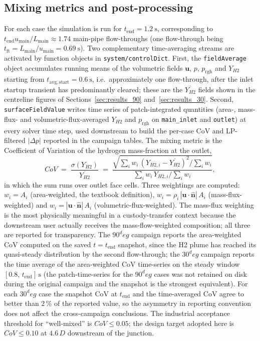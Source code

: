 \documentclass[11pt,a4paper]{article}
\def\Hi{H2}%
\def\CoV{CoV}%
\def\circ{ deg}%
\newcommand{\Hi}{\ensuremath{\mathrm{H_2}}}
\newcommand{\CoV}{\ensuremath{\mathrm{CoV}}}
\begin{document}
\subsection{Mixing metrics and post-processing}
\label{sec:method_metrics}
For each case the simulation is run for
\(t_{\mathrm{end}} = \SI{1.2}{\second}\), corresponding to
\(t_{\mathrm{end}} u_{\mathrm{main}}/L_{\mathrm{main}} \approx 1.74\)
main-pipe flow-throughs (one flow-through being
\(t_{\mathrm{ft}} = L_{\mathrm{main}}/u_{\mathrm{main}}
= \SI{0.69}{\second}\)). Two complementary time-averaging streams
are activated by function objects in \texttt{system/controlDict}.
First, the \texttt{fieldAverage} object accumulates running means
of the volumetric fields \(\mathbf{u}\), \(p\),
\(p_{\mathrm{rgh}}\) and \(Y_{\Hi}\) starting from
\(t_{\mathrm{avg,start}} = \SI{0.6}{\second}\), i.e.\
approximately one flow-through, after the inlet startup transient
has predominantly cleared; these are the \(\overline{Y_{\Hi}}\)
fields shown in the centreline figures of
Sections~\ref{sec:results_90} and~\ref{sec:results_30}. Second,
\texttt{surfaceFieldValue} writes time series of patch-integrated
quantities (area-, mass-flux- and volumetric-flux-averaged
\(Y_{\Hi}\) and \(p_{\mathrm{rgh}}\) on \texttt{main\_inlet} and
\texttt{outlet}) at every solver time step, used downstream to
build the per-case CoV and LP-filtered \(|\Delta p|\) reported in
the campaign tables. The mixing metric is the Coefficient of
Variation of the hydrogen mass-fraction at the outlet,
\begin{equation}
\CoV \;=\; \frac{\sigma\!\left(Y_{\Hi}\right)}{\overline{Y_{\Hi}}}
\;=\; \frac{\sqrt{\sum_i w_i\,(Y_{\Hi,i}-\overline{Y_{\Hi}})^2/\sum_i w_i}}
{\sum_i w_i\,Y_{\Hi,i}/\sum_i w_i},
\label{eq:cov}
\end{equation}
in which the sum runs over outlet face cells. Three weightings are
computed: \(w_i = A_i\) (area-weighted, the textbook definition),
\(w_i = \rho_i\,|\mathbf{u}\cdot\hat{\mathbf{n}}|\,A_i\)
(mass-flux-weighted) and
\(w_i = |\mathbf{u}\cdot\hat{\mathbf{n}}|\,A_i\)
(volumetric-flux-weighted). The mass-flux weighting is the most
physically meaningful in a custody-transfer context because the
downstream user actually receives the mass-flow-weighted
composition; all three are reported for transparency. The
\(90^\circ\) campaign reports the area-weighted CoV computed on
the saved \(t=t_{\mathrm{end}}\) snapshot, since the \Hi{} plume
has reached its quasi-steady distribution by the second
flow-through; the \(30^\circ\) campaign reports the time average
of the area-weighted CoV time-series on the steady
window \([0.8,\,t_{\mathrm{end}}]\,\si{\second}\) (the
patch-time-series for the \(90^\circ\) cases was not retained on
disk during the original campaign and the snapshot is the
strongest equivalent). For each \(30^\circ\) case the snapshot
CoV at \(t_{\mathrm{end}}\) and the time-averaged CoV agree to
better than \(2\,\%\) of the reported value, so the asymmetry in
reporting convention does not affect the cross-campaign
conclusions. The industrial acceptance threshold for
``well-mixed'' is \(\CoV \le 0.05\); the design target adopted
here is \(\CoV \le 0.10\) at \(4.6\,D\) downstream of the
junction.
\end{document}
